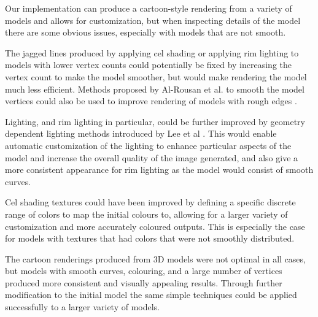 Our implementation can produce a cartoon-style rendering from a variety of models and 
allows for customization, but when inspecting details of the model there are some obvious 
issues, especially with models that are not smooth.

The jagged lines produced by applying cel shading or applying rim lighting to models with 
lower vertex counts could potentially be fixed by increasing the vertex count to make the model 
smoother, but would make rendering the model much less efficient. Methods proposed by Al-Rousan et 
al. to smooth the model vertices could also be used to improve rendering of models with rough 
edges \cite{rousan16}. 

Lighting, and rim lighting in particular, could be further improved by geometry dependent 
lighting methods introduced by Lee et al \cite{lee06}. This would enable automatic customization 
of the lighting to enhance particular aspects of the model and increase the overall quality of 
the image generated, and also give a more consistent appearance for rim lighting as the model 
would consist of smooth curves.

Cel shading textures could have been improved by defining a specific discrete range of colors 
to map the initial colours to, allowing for a larger variety of customization and more accurately 
coloured outputs. This is especially the case for models with textures that had colors that were 
not smoothly distributed.

The cartoon renderings produced from 3D models were not optimal in all cases, but models with 
smooth curves, colouring, and a large number of vertices produced more consistent and visually 
appealing results. Through further modification to the initial model the same simple techniques 
could be applied successfully to a larger variety of models.